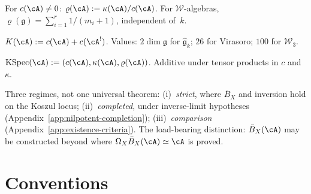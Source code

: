\begin{definition}\label{def:anomaly-ratio}
For $c(\cA) \neq 0$: $\varrho(\cA) := \kappa(\cA)/c(\cA)$.
For $\mathcal{W}$-algebras,
$\varrho(\mathfrak{g}) = \sum_{i=1}^r 1/(m_i+1)$, independent
of~$k$.
\end{definition}

\begin{definition}\label{def:koszul-conductor}
$K(\cA) := c(\cA) + c(\cA^!)$.  Values: $2\dim\mathfrak{g}$ for
$\widehat{\mathfrak{g}}_k$; $26$ for Virasoro; $100$ for
$\mathcal{W}_3$.
\end{definition}

\begin{definition}\label{def:koszul-spectrum}
$\operatorname{KSpec}(\cA) := (c(\cA), \kappa(\cA),
\varrho(\cA))$.  Additive under tensor products in $c$
and~$\kappa$.
\end{definition}

\begin{remark}\label{rem:existence-regimes}
\label{rem:existence-koszul}
Three regimes, not one universal theorem:
(i)~\emph{strict}, where $\bar{B}_X$ and inversion hold on the
Koszul locus;
(ii)~\emph{completed}, under inverse-limit hypotheses
(Appendix~\ref{app:nilpotent-completion});
(iii)~\emph{comparison}
(Appendix~\ref{app:existence-criteria}).
The load-bearing distinction: $\bar{B}_X(\cA)$ may be constructed
beyond where $\Omega_X\bar{B}_X(\cA) \simeq \cA$ is proved.
\end{remark}


\section{Conventions}
\label{sec:standing-assumptions}

